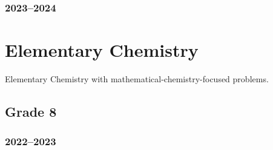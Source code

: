 \documentclass{article}
\begin{document}
\subsubsection{2023--2024}


\section{Elementary Chemistry}
Elementary Chemistry with mathematical-chemistry-focused problems.

\subsection{Grade 8}

\subsubsection{2022--2023}
\end{document}
